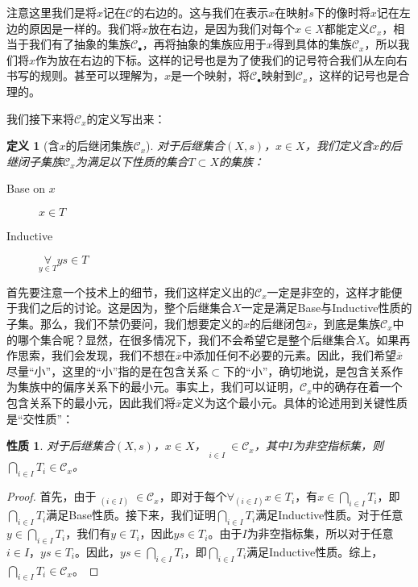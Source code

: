 \documentclass[oneside, 12pt]{ctexart}
\newtheorem{definition}{定义}[section]
\newtheorem{property}{性质}[section]
\begin{document}
注意这里我们是将$x$记在$\mathcal{C}$的右边的。这与我们在表示$x$在映射$s$下的像时将$x$记在左边的原因是一样的。我们将$x$放在右边，是因为我们对每个$x \in X$都能定义$\mathcal{C}_x$，相当于我们有了抽象的集族$\mathcal{C}_{\bullet}$，再将抽象的集族应用于$x$得到具体的集族$\mathcal{C}_x$，所以我们将$x$作为放在右边的下标。这样的记号也是为了使我们的记号符合我们从左向右书写的规则。甚至可以理解为，$x$是一个映射，将$\mathcal{C}_\bullet$映射到$\mathcal{C}_x$，这样的记号也是合理的。

我们接下来将$\mathcal{C}_x$的定义写出来：

\begin{definition}[含$x$的后继闭集族$\mathcal{C}_x$]
	对于后继集合$(X, s)$，$x \in X$，我们定义含$x$的后继闭子集族$\mathcal{C}_x$为满足以下性质的集合$T \subset X$的集族：
	\begin{description}
		\item[Base on $x$] $x \in T$
		\item[Inductive] $\mathop{\forall}\limits_{y \in T} ys \in T$
	\end{description}
\end{definition}

首先要注意一个技术上的细节，我们这样定义出的$\mathcal{C}_x$一定是非空的，这样才能便于我们之后的讨论。这是因为，整个后继集合$X$一定是满足Base与Inductive性质的子集。那么，我们不禁仍要问，我们想要定义的$x$的后继闭包$\overline{x}$，到底是集族$\mathcal{C}_x$中的哪个集合呢？显然，在很多情况下，我们不会希望它是整个后继集合$X$。如果再作思索，我们会发现，我们不想在$\overline{x}$中添加任何不必要的元素。因此，我们希望$\overline{x}$尽量“小”，这里的“小”指的是在包含关系$\subset$下的“小”，确切地说，是包含关系作为集族中的偏序关系下的最小元。事实上，我们可以证明，$\mathcal{C}_x$中的确存在着一个包含关系下的最小元，因此我们将$\overline{x}$定义为这个最小元。具体的论述用到关键性质是“交性质”：

\begin{property}
	对于后继集合$(X, s)$，$x \in X$，$\mathop{T_i}\limits_{i \in I} \in \mathcal{C}_x$，其中$I$为非空指标集，则$\bigcap\limits_{i \in I} T_i \in \mathcal{C}_x$。
\end{property}

\begin{proof}
	首先，由于$\mathop{T_i}_{(i \in I)} \in \mathcal{C}_x$，即对于每个$\mathop{\forall}_{(i \in I)}x \in T_i$，有$x \in \bigcap_{i \in I} T_i$，即$\bigcap_{i \in I} T_i$满足Base性质。接下来，我们证明$\bigcap_{i \in I} T_i$满足Inductive性质。对于任意$y \in \bigcap_{i \in I} T_i$，我们有$y \in T_i$，因此$ys \in T_i$。由于$I$为非空指标集，所以对于任意$i \in I$，$ys \in T_i$。因此，$ys \in \bigcap_{i \in I} T_i$，即$\bigcap_{i \in I} T_i$满足Inductive性质。综上，$\bigcap_{i \in I} T_i \in \mathcal{C}_x$。
\end{proof}
\end{document}
